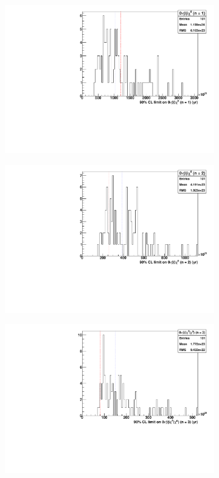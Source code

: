 \documentclass[herrin-thesis.tex]{subfiles}
\begin{document}
\begin{figure}[htb]
\centering
	\begin{subfigure}[c]{0.48\textwidth}
	\centering
	\includegraphics[width=\textwidth]{./plots/analysis_bb0nX1_sensitivity.pdf}
	\end{subfigure}\hfill%
	\begin{subfigure}[c]{0.48\textwidth}
	\centering
	\includegraphics[width=\textwidth]{./plots/analysis_bb0nX2_sensitivity.pdf}
	\end{subfigure}
	\begin{subfigure}[c]{0.48\textwidth}
	\centering
	\includegraphics[width=\textwidth]{./plots/analysis_bb0nX3_sensitivity.pdf}

\end{subfigure}
\end{figure}
\end{document}
